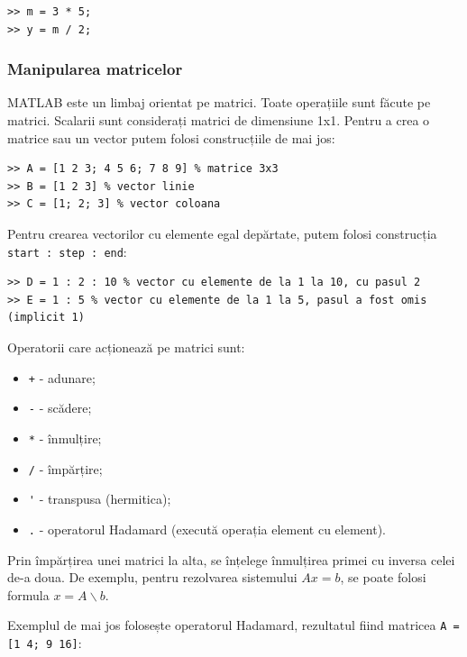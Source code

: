 \documentclass{exam}
\begin{document}
\begin{lstlisting}
>> m = 3 * 5;
>> y = m / 2;
\end{lstlisting}

\subsubsection{Manipularea matricelor}

\par MATLAB este un limbaj orientat pe matrici. Toate operațiile sunt făcute pe
matrici. Scalarii sunt considerați matrici de dimensiune 1x1. Pentru a crea o
matrice sau un vector putem folosi construcțiile de mai jos:

\begin{lstlisting}
>> A = [1 2 3; 4 5 6; 7 8 9] % matrice 3x3
>> B = [1 2 3] % vector linie
>> C = [1; 2; 3] % vector coloana
\end{lstlisting}

\par Pentru crearea vectorilor cu elemente egal depărtate, putem folosi
construcția \verb|start : step : end|:

\begin{lstlisting}
>> D = 1 : 2 : 10 % vector cu elemente de la 1 la 10, cu pasul 2
>> E = 1 : 5 % vector cu elemente de la 1 la 5, pasul a fost omis (implicit 1)
\end{lstlisting}

\par Operatorii care acționează pe matrici sunt:

\begin{itemize}
	\item \verb|+| - adunare;
	\item \verb|-| - scădere;
	\item \verb|*| - înmulțire;
	\item \verb|/| - împărțire;
	\item \verb|'| - transpusa (hermitica);
	\item \verb|.| - operatorul Hadamard (execută operația element cu element).
\end{itemize}

\par Prin împărțirea unei matrici la alta, se înțelege înmulțirea primei cu
inversa celei de-a doua. De exemplu, pentru rezolvarea sistemului $Ax = b$, se
poate folosi formula $x = A \backslash b$.

\par Exemplul de mai jos folosește operatorul Hadamard, rezultatul fiind
matricea \verb|A = [1 4; 9 16]|:
\end{document}
